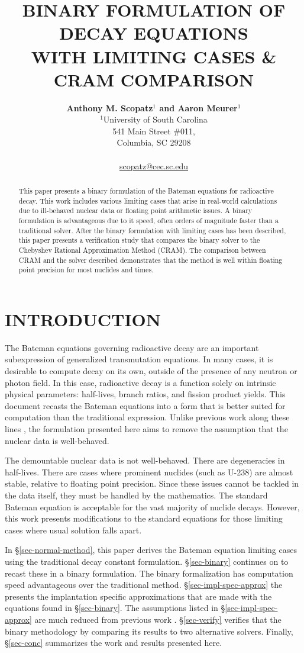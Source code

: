 \documentclass[letterpaper]{physor2018}
\title{BINARY FORMULATION OF DECAY EQUATIONS \\
       WITH LIMITING CASES \& CRAM COMPARISON}
\author{%
  \textbf{Anthony M. Scopatz$^1$ and Aaron Meurer$^1$}\\
  $^1$University of South Carolina \\
  541 Main Street \#011, \\
  Columbia, SC 29208 \\
  \\
  \url{scopatz@cec.sc.edu}
}
\begin{document}
\maketitle
\justify

\begin{abstract}
This paper presents a binary formulation of the Bateman equations
for radioactive decay. This work includes various limiting cases
that arise in real-world calculations due to ill-behaved nuclear data
or floating point arithmetic issues. A binary formulation is advantageous
due to it speed, often orders of magnitude faster than a traditional solver.
After the binary formulation with limiting cases has been described,
this paper presents a verification study that compares the binary solver
to the Chebyshev Rational Approximation Method (CRAM). The comparison
between CRAM and the solver described demonstrates that the method is
well within floating point precision for most nuclides and times.
\end{abstract}

\section{INTRODUCTION}
\label{sec-intro}
The Bateman equations governing radioactive decay are an important subexpression
of generalized transmutation equations. In many cases, it is desirable to compute
decay on its own, outside of the presence of any neutron or photon field. In this
case, radioactive decay is a function solely on intrinsic physical parameters:
half-lives, branch ratios, and fission product yields. This document recasts the
Bateman equations into a form that is better suited for computation than
the traditional expression. Unlike previous work along these lines
\cite{scopatz2015decay}, the formulation presented here aims to remove the
assumption that the nuclear data is well-behaved.

The demountable nuclear data is not well-behaved. There are degeneracies in
half-lives. There are cases where prominent nuclides (such as U-238) are
almost stable, relative to floating point precision. Since these issues
cannot be tackled in the data itself, they must be handled by the
mathematics. The standard Bateman equation is acceptable for the
vast majority of nuclide decays. However, this work presents modifications
to the standard equations for those limiting cases where usual solution
falls apart.

In \S\ref{sec-normal-method}, this paper derives the Bateman equation
limiting cases using the traditional decay constant formulation.
\S\ref{sec-binary} continues on to recast these in a binary formulation.
The binary formalization has computation speed advantageous over the
traditional method. \S\ref{sec-impl-spec-approx} the presents the implantation
specific approximations that are made with the equations found in
\S\ref{sec-binary}. The assumptions listed in \S\ref{sec-impl-spec-approx}
are much reduced from previous work \cite{scopatz2015decay}.
\S\ref{sec-verify} verifies that the binary methodology by comparing its
results to two alternative solvers. Finally, \S\ref{sec-conc} summarizes
the work and results presented here.
\end{document}
